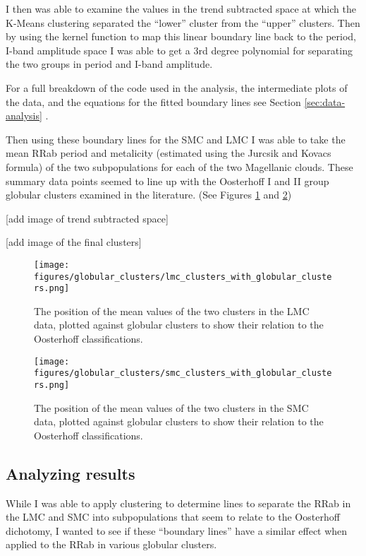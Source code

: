 \documentclass[]{article}
\begin{document}
I then was able to examine the values in the trend subtracted space at which the K-Means clustering separated the ``lower'' cluster from the ``upper'' clusters. Then by using the kernel function to map this linear boundary line back to the period, I-band amplitude space I was able to get a 3rd degree polynomial for separating the two groups in period and I-band amplitude.

For a full breakdown of the code used in the analysis, the intermediate plots of the data, and the equations for the fitted boundary lines see Section \ref{sec:data-analysis} .

Then using these boundary lines for the SMC and LMC I was able to take the mean RRab period and metalicity (estimated using the Jurcsik and Kovacs formula) of the two subpopulations for each of the two Magellanic clouds. These summary data points seemed to line up with the Oosterhoff I and II group globular clusters examined in the literature. (See Figures \ref{fig:lmc_clustering_with_gcs} and \ref{fig:smc_clustering_with_gcs})

[add image of trend subtracted space]

[add image of the final clusters]

\begin{figure}
	\centering
	\texttt{[image: figures/globular\_clusters/lmc\_clusters\_with\_globular\_clusters.png]}
	\caption{The position of the mean values of the two clusters in the LMC data, plotted against globular clusters to show their relation to the Oosterhoff classifications.}
	\label{fig:lmc_clustering_with_gcs}
\end{figure}

\begin{figure}
	\centering
	\texttt{[image: figures/globular\_clusters/smc\_clusters\_with\_globular\_clusters.png]}
	\caption{The position of the mean values of the two clusters in the SMC data, plotted against globular clusters to show their relation to the Oosterhoff classifications.}
	\label{fig:smc_clustering_with_gcs}
\end{figure}

\subsection{Analyzing results}
While I was able to apply clustering to determine lines to separate the RRab in the LMC and SMC into subpopulations that seem to relate to the Oosterhoff dichotomy, I wanted to see if these “boundary lines” have a similar effect when applied to the RRab in various globular clusters.
\end{document}
